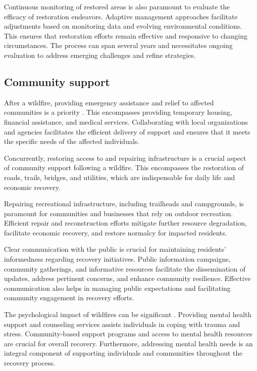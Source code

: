 \documentclass[
  12 pt,
]{Nemilov}
\begin{document}
Continuous monitoring of restored areas is also paramount to evaluate the efficacy of restoration endeavors. Adaptive management approaches facilitate adjustments based on monitoring data and evolving environmental conditions. This ensures that restoration efforts remain effective and responsive to changing circumstances. The process can span several years and necessitates ongoing evaluation to address emerging challenges and refine strategies.

\subsection{Community support}\label{community-support}

After a wildfire, providing emergency assistance and relief to affected communities is a priority \citep{edgeley2017community}. This encompasses providing temporary housing, financial assistance, and medical services. Collaborating with local organizations and agencies facilitates the efficient delivery of support and ensures that it meets the specific needs of the affected individuals.

Concurrently, restoring access to and repairing infrastructure is a crucial aspect of community support following a wildfire. This encompasses the restoration of roads, trails, bridges, and utilities, which are indispensable for daily life and economic recovery.

Repairing recreational infrastructure, including trailheads and campgrounds, is paramount for communities and businesses that rely on outdoor recreation. Efficient repair and reconstruction efforts mitigate further resource degradation, facilitate economic recovery, and restore normalcy for impacted residents.

Clear communication with the public is crucial for maintaining residents' informedness regarding recovery initiatives. Public information campaigns, community gatherings, and informative resources facilitate the dissemination of updates, address pertinent concerns, and enhance community resilience. Effective communication also helps in managing public expectations and facilitating community engagement in recovery efforts.

The psychological impact of wildfires can be significant \citep{finlay2012health, palinkas2020global}. Providing mental health support and counseling services assists individuals in coping with trauma and stress. Community-based support programs and access to mental health resources are crucial for overall recovery. Furthermore, addressing mental health needs is an integral component of supporting individuals and communities throughout the recovery process.
\end{document}
